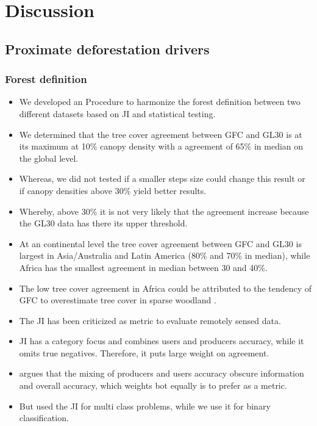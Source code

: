 \chapter{Discussion}
\label{ch:discussion}
	\section{Proximate deforestation drivers}
	\label{sec:discussion_deforestation}

		\subsection{Forest definition}
		\label{subsec:discussion_forest_definition}
			\begin{itemize}
				\item We developed an Procedure to harmonize the forest definition between two different datasets based on \ac{JI} and statistical testing.
				\item We determined that the tree cover agreement between \ac{GFC} and \ac{GL30} is at its maximum at 10\% canopy density with a agreement of 65\% in median on the global level.
				\item Whereas, we did not tested if a smaller steps size could change this result or if canopy densities above 30\% yield better results.
				\item Whereby, above 30\% it is not very likely that the agreement increase because the \ac{GL30}
				data has there its upper threshold.
				\item At an continental level the tree cover agreement between \ac{GFC} and \ac{GL30} is largest in Asia/Australia and Latin America (80\% and 70\% in median), while Africa has the smallest agreement in median between 30 and 40\%.  
				\item The low tree cover agreement in Africa could be attributed to the tendency of \ac{GFC} to overestimate tree cover in sparse woodland \citep{Gross2017}.
				\item The \ac{JI} has been criticized as metric to evaluate remotely sensed data. 
				\item \ac{JI} has a category focus and combines users and producers accuracy, while it omits true negatives. Therefore, it puts large weight on agreement.
				\item \citep{Li2017a} argues that the mixing of producers and users accuracy obscure information and overall accuracy, which weights bot equally is to prefer as a metric.
				\item But \citep{Li2017a} used the \ac{JI} for multi class problems, while we use it for binary classification.

\end{itemize}
